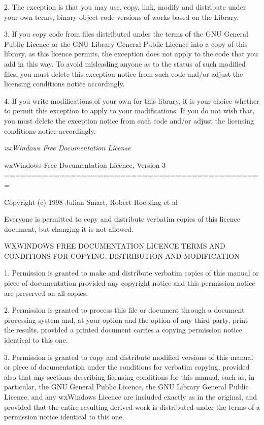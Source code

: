2. The exception is that you may use, copy, link, modify and distribute
under your own terms, binary object code versions of works based on the
Library.

3. If you copy code from files distributed under the terms of the GNU
General Public Licence or the GNU Library General Public Licence into a
copy of this library, as this licence permits, the exception does not apply
to the code that you add in this way.  To avoid misleading anyone as to the
status of such modified files, you must delete this exception notice from
such code and/or adjust the licensing conditions notice accordingly.

4. If you write modifications of your own for this library, it is your
choice whether to permit this exception to apply to your modifications.  If
you do not wish that, you must delete the exception notice from such code
and/or adjust the licensing conditions notice accordingly.

\textit{wxWindows Free Documentation License}

\begin{center}
	wxWindows Free Documentation Licence, Version 3
	===============================================
\end{center}

Copyright (c) 1998 Julian Smart, Robert Roebling et al

Everyone is permitted to copy and distribute verbatim copies
of this licence document, but changing it is not allowed.

\begin{center}
	WXWINDOWS FREE DOCUMENTATION LICENCE
	TERMS AND CONDITIONS FOR COPYING, DISTRIBUTION AND MODIFICATION
\end{center}

1. Permission is granted to make and distribute verbatim copies of this
manual or piece of documentation provided any copyright notice and this
permission notice are preserved on all copies.

2. Permission is granted to process this file or document through a
document processing system and, at your option and the option of any third
party, print the results, provided a printed document carries a copying
permission notice identical to this one.

3. Permission is granted to copy and distribute modified versions of this
manual or piece of documentation under the conditions for verbatim copying,
provided also that any sections describing licensing conditions for this
manual, such as, in particular, the GNU General Public Licence, the GNU
Library General Public Licence, and any wxWindows Licence are included
exactly as in the original, and provided that the entire resulting derived
work is distributed under the terms of a permission notice identical to
this one.

